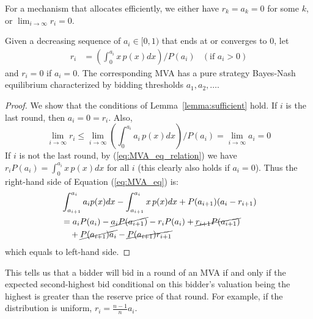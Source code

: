 
For a mechanism that allocates efficiently, we either have $r_k = a_k = 0$
for some $k$, or $\lim_{i \rightarrow \infty} r_i = 0$.

\begin{theorem}
Given a decreasing sequence of $a_i \in [0,1)$ that ends at or converges to
$0$, let
\begin{align}\label{eq:MVA_eq_relation}
  r_i &= \left( \int_{0}^{a_i} x \, p(x) dx \right) / P(a_i) & (\mbox{if $a_i > 0$})
\end{align}
and $r_i=0$ if $a_i=0$. The corresponding MVA has a pure strategy Bayes-Nash equilibrium characterized by
bidding thresholds $a_1, a_2, \ldots$.
\end{theorem}

\begin{proof}
We show that the conditions of Lemma~\ref{lemma:sufficient} hold.  If $i$
is the last round, then $a_i=0=r_i$.  Also, $$\lim_{i\rightarrow\infty} r_i \leq \lim_{i\rightarrow\infty}
\left( \int_{0}^{a_i} a_i \, p(x) dx \right) / P(a_i) = \lim_{i\rightarrow\infty} a_i = 0$$
If $i$ is not the last round, 
by (\ref{eq:MVA_eq_relation}) we have $r_i P(a_i) = \int_{0}^{a_i}
x\,p(x)dx$ for all $i$ (this clearly also holds if
$a_i = 0$). Thus the right-hand side of Equation (\ref{eq:MVA_eq}) is:
\begin{align*}
	& \int_{a_{i+1}}^{a_i} a_i p(x) dx - \int_{a_{i+1}}^{a_i} x \, p(x) dx + P(a_{i+1})(a_i-r_{i+1}) \\
	&= a_i P(a_i) - \cancel{a_i P(a_{i+1})} - r_i P(a_i) + \cancel{r_{i+1} P(a_{i+1})} \\
		& ~~~ + \cancel{P(a_{i+1}) a_i} - \cancel{P(a_{i+1}) r_{i+1}}
\end{align*}
which equals to left-hand side.
\end{proof}

This tells us that a bidder will bid in a round of an MVA if and only if
the expected second-highest bid conditional on this bidder's valuation
being the highest is greater than the reserve price of that round. For
example, if the distribution is uniform, $r_i = \frac{n-1}{n}
a_i$. 

